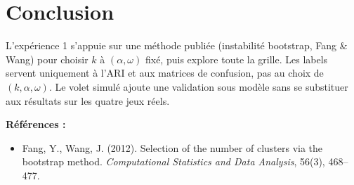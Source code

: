 \documentclass[11pt, a4paper]{article}
\begin{document}
\section{Conclusion}

L'expérience 1 s'appuie sur une méthode publiée (instabilité bootstrap, Fang \&
Wang) pour choisir $k$ à $(\alpha,\omega)$ fixé, puis explore toute la grille.
Les labels servent uniquement à l'ARI et aux matrices de confusion, pas au choix
de $(k,\alpha,\omega)$. Le volet simulé ajoute une validation sous modèle sans
se substituer aux résultats sur les quatre jeux réels.

\vspace{1em}
\noindent\textbf{Références :}
\begin{itemize}
  \item Fang, Y., Wang, J. (2012). Selection of the number of clusters via the
    bootstrap method. \textit{Computational Statistics and Data Analysis}, 56(3),
    468--477.
\end{itemize}
\end{document}
